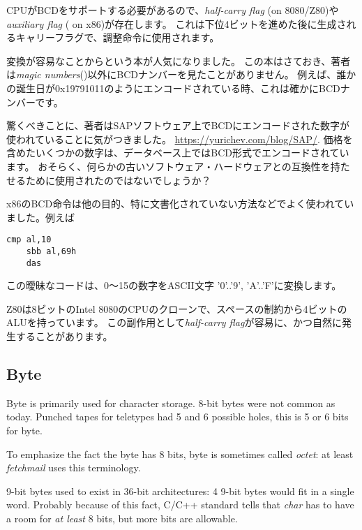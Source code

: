 CPUが\ac{BCD}をサポートする必要があるので、\emph{half-carry flag} (on 8080/Z80)や
\emph{auxiliary flag} ( on x86)が存在します。
これは下位4ビットを進めた後に生成されるキャリーフラグで、調整命令に使用されます。

変換が容易なことからという本が人気になりました。
この本はさておき、著者は\emph{magic numbers}()以外に\ac{BCD}ナンバーを見たことがありません。
例えば、誰かの誕生日が0x19791011のようにエンコードされている時、これは確かに\ac{BCD}ナンバーです。

驚くべきことに、著者はSAPソフトウェア上で\ac{BCD}にエンコードされた数字が使われていることに気がつきました。 \url{https://yurichev.com/blog/SAP/}.
価格を含めたいくつかの数字は、データベース上ではBCD形式でエンコードされています。
おそらく、何らかの古いソフトウェア・ハードウェアとの互換性を持たせるために使用されたのではないでしょうか？

x86の\ac{BCD}命令は他の目的、特に文書化されていない方法などでよく使われていました。例えば

\begin{lstlisting}[style=customasmx86]
	cmp al,10
	sbb al,69h
	das
\end{lstlisting}
この曖昧なコードは、0～15の数字を\ac{ASCII}文字 '0'..'9', 'A'..'F'に変換します。


Z80は8ビットのIntel 8080のCPUのクローンで、スペースの制約から4ビットの\ac{ALU}を持っています。
この副作用として\emph{half-carry flag}が容易に、かつ自然に発生することがあります。

\subsection{Byte}

Byte is primarily used for character storage.
8-bit bytes were not common as today.
Punched tapes for teletypes had 5 and 6 possible holes, this is 5 or 6 bits for byte.

To emphasize the fact the byte has 8 bits, byte is sometimes called \emph{octet}:
at least \emph{fetchmail} uses this terminology.

9-bit bytes used to exist in 36-bit architectures: 4 9-bit bytes would fit in a single \gls{word}.
Probably because of this fact, C/C++ standard tells that \emph{char} has to have a room for \emph{at least} 8 bits, but more
bits are allowable.

